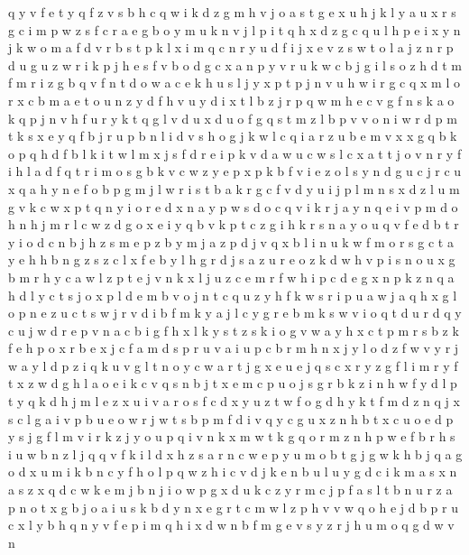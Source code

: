 \documentclass{article}
\begin{document}
q y v f
e t y q f z v s b h
c q w i
k d z g
m h v j o a s t g e x u
h j k l y a u x r s g c i m p
w z s f c r a e g b o y m u k n v j l p i t q h x d
z g c q u l h p e i x y n j k w o m a f d v r b s t
p k l x i m
q c n r y u d f i j x e v z s w t
o l a j z n r p d u g
u z w r i k p j h e s f v b o d g c x
a n p y v r u k w c b j g i l s o z h d t m f
m r i z g b q v f n t d o w a c e k h u s l j y x p
t p j n v u h w i r g c q x m l o
r x c b m a e t o u n z y d f h v
u y d i x t l b z j r p q w m h e c v g f n s k a o
k q p j n
v h f u
r y k t q g l v d u x
d u o f g q s t m z l b p v
v o n i w r d p m t k s x e y q f b
j r u p b n l i d v
s h o g j k w l c q i a r z u b e m v x
x g q b k
o p q h d f b l k i t
w l m x j s f d r e i p
k
v d a w u c
w s l c x a t
t j o v n r y f i h
l a d f q t r i m o s g b k v c w z y e p x
p k b f v i e z o l s y n d g u c j r
c u x q a h y n e f o b p g m j l w r i s t
b a k r g c f v d y u i j p l m n s x
d z l u m g v k c w x p t q n y i o r e
d
x n a y p w s d o c q v
i
k r j a y n q e i v p m d o h
n h j m r l c w z d g o x e i y q b v k p t
c z g i h k r s n a y o u q v f e d b t
r y i o d c n b j h z s m e p
z b y m j a
z p d j v q x b l i n u k w f m o r s g c t a y e h
h b n g z
s z c l x f e b y
l h
g r d j s a z u
r e o z k d w h
v p
i s n o u x g b m r h y c a w l z p t e j
v n k x l j u z c e m r f w h i p
c d e g x n p
k z n q a h d l y c t s j o
x p l d e m b v o j n t c q u z y h f k w s r i
p u a w j
a q h x g l o p n e z u c t s w j r v d i b f m k y
a j l c y g r e b m k s w v i o q t d u
r d q y c
u j w d r e p v n a c b i g f h x l k y s t z
s k i o g v w a y h x c t p m r
s
b z k f e h p o x r
b e x j c f a m d s p r u v
a i u p c b r m h n x j y l o d z f w v
y
r j w a
y l d p z i
q k u v g l t n o y c w a r
t j g x e u
e j q s c x r y z g f l i
m r y f t x z w d g h l a o e i k c v q s n b j
t x e m c p u o j s g r b k z i n h w f y d l
p t y q k d h j m l e z x u i v a r o s f
c d x y u z t w f o g
d
h y k t f m d z n q j x s c l g a i v p b u e o w r
j w t s b p m f d i v q y c g u x z
n h b t x c u o e d p y s j g f l m v i r k z
j y o u p q i v n k x m w t
k g q o r
m z n h p w e f b
r h s i u w b n z l j q
q v f k i l d x h z s a r n c w e p y u m o b t g j
g w k h b
j q a g o d x u m i k b n c y f h
o l p q w z h i c v d j k e n b u
l u y g d c i k m a s x n
a s z x q d c w k e m j b
n j i o w p g x d u k c z y r m
c j p f a s
l
t
b n u r z
a
p n o t x g b
j o a i u s k b d y n x e g r t c m w l z p h v
v w q o h e j d b p r u c x l y
b h q n y v f e p i m
q h i x d w n b f m g e v s
y z r j h u m o q g d w v n
\end{document}
